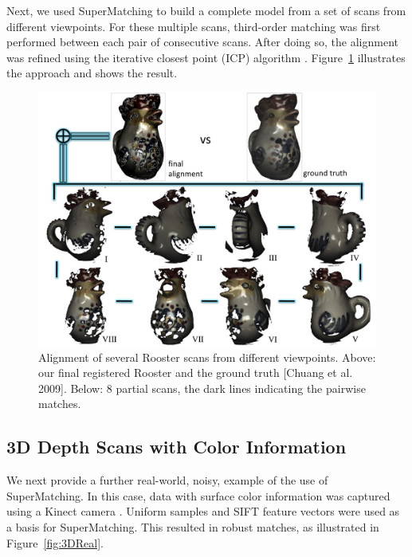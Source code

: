 Next, we used SuperMatching to build a complete model from a set of scans from different viewpoints.
For these multiple scans, third-order matching was first performed between each pair of consecutive scans.
After doing so, the alignment was refined using the iterative closest point (ICP) algorithm \cite{Besl92}.
Figure~\ref{fig:3DRigid} illustrates the approach and shows the result.

\begin{figure}[t!]
\centering
  \includegraphics[width=0.99\linewidth]{figures/Rooster.pdf}
  \caption{Alignment of several Rooster scans from different viewpoints.
  Above: our final registered Rooster and the ground truth [Chuang et al. 2009]. Below: 8 partial scans, the dark lines indicating the pairwise matches.}
\label{fig:3DRigid}
\end{figure}

\subsection{3D Depth Scans with Color Information}
\label{subsec:3dColored}

We next provide a further real-world, noisy, example of the use of SuperMatching.
In this case, data with surface color information was captured using a Kinect camera \cite{Kinect12}.
Uniform samples and SIFT feature vectors were used as a basis for SuperMatching.
This resulted in robust matches, as illustrated in Figure~\ref{fig:3DReal}.

